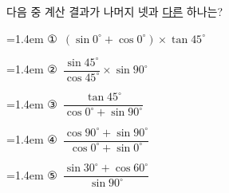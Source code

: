 다음 중 계산 결과가 나머지 넷과 \underline{다른} 하나는?
\par\medskip\par\noindent\hangindent=1.4em {\small ①}\ $(\sin 0^\circ+\cos 0^\circ)\times\tan 45^\circ$\par\noindent\hangindent=1.4em {\small ②}\ $\dfrac{\sin 45^\circ}{\cos 45^\circ}\times\sin 90^\circ$\par\noindent\hangindent=1.4em {\small ③}\ $\dfrac{\tan 45^\circ}{\cos 0^\circ+\sin 90^\circ}$\par\noindent\hangindent=1.4em {\small ④}\ $\dfrac{\cos 90^\circ+\sin 90^\circ}{\cos 0^\circ+\sin 0^\circ}$\par\noindent\hangindent=1.4em {\small ⑤}\ $\dfrac{\sin 30^\circ+\cos 60^\circ}{\sin 90^\circ}$\par\medskip
